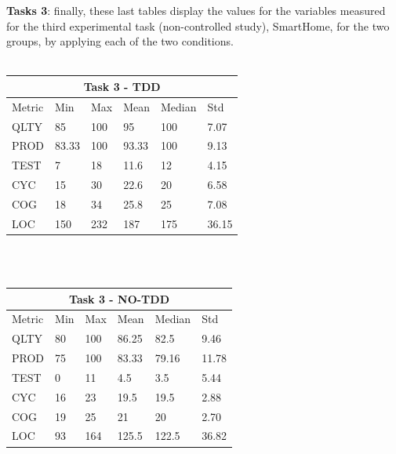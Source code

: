 \textbf{Tasks 3}: finally, these last tables display the values for the variables measured for the third experimental task (non-controlled study), SmartHome, for the two groups, by applying each of the two conditions.
\\ \  \\
\noindent
\begin{tabular}{ |p{2cm}||p{1.6cm}|p{1.6cm}|p{1.6cm}|p{1.6cm}|p{1.6cm}|}
    \hline
        \multicolumn{6}{|c|}{Task 3 - TDD} \\
    \hline
        Metric & Min & Max & Mean & Median & Std\\
    \hline
        QLTY & 85 & 100 & 95 & 100 & 7.07 \\
        PROD & 83.33 & 100 & 93.33 & 100 & 9.13 \\
        TEST & 7 & 18 & 11.6 & 12 & 4.15 \\
        CYC & 15 & 30 & 22.6 & 20 & 6.58 \\
        COG & 18 & 34 & 25.8 & 25 & 7.08 \\
        LOC & 150 & 232 & 187 & 175 & 36.15 \\
    \hline
\end{tabular}
\\ \  \\
\noindent
\begin{tabular}{ |p{2cm}||p{1.6cm}|p{1.6cm}|p{1.6cm}|p{1.6cm}|p{1.6cm}|}
    \hline
        \multicolumn{6}{|c|}{Task 3 - NO-TDD} \\
    \hline
        Metric & Min & Max & Mean & Median & Std\\
    \hline
        QLTY & 80 & 100 & 86.25 & 82.5 & 9.46 \\
        PROD & 75 & 100 & 83.33 & 79.16 & 11.78 \\
        TEST & 0 & 11 & 4.5 & 3.5 & 5.44 \\
        CYC & 16 & 23 & 19.5 & 19.5 & 2.88 \\
        COG & 19 & 25 & 21 & 20 & 2.70 \\
        LOC & 93 & 164 & 125.5 & 122.5 & 36.82 \\
    \hline
\end{tabular}
\\ \  \\
